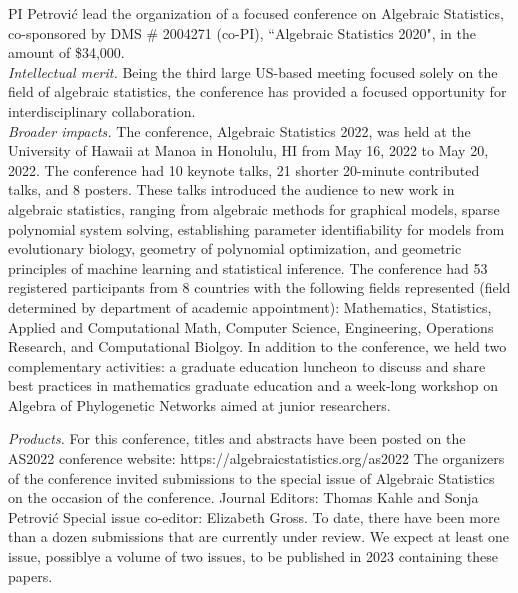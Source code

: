 \documentclass[11pt]{NSFamsart}
\begin{document}
PI Petrovi\'c  lead the organization of a focused 
 conference on Algebraic Statistics, co-sponsored by DMS \# 2004271 (co-PI), ``Algebraic Statistics 2020", in the amount of  \$34,000. 
\\
\emph{Intellectual merit.} Being the third large US-based meeting focused solely on the field of algebraic statistics,  the conference has provided a focused opportunity for interdisciplinary collaboration. 
\\
\emph{Broader impacts.} 
The conference, Algebraic Statistics 2022, was held at the University of Hawaii at Manoa in Honolulu, HI from May 16, 2022 to May 20, 2022. The conference had 10 keynote talks, 21 shorter 20-minute contributed talks, and 8 posters. These talks introduced the audience to new work in algebraic statistics, ranging from algebraic methods for graphical models, sparse polynomial system solving, establishing parameter identifiability for models from evolutionary biology, geometry of polynomial optimization, and geometric principles of machine learning and statistical inference.
The conference had 53 registered participants from 8 countries with the following fields represented (field determined by department of academic appointment): Mathematics, Statistics, Applied and Computational Math, Computer Science, Engineering, Operations Research, and Computational Biolgoy.  
In addition to the conference, we held two complementary activities: a graduate education luncheon to discuss and share best practices in mathematics graduate education and a week-long workshop on Algebra of Phylogenetic Networks aimed at junior researchers.

\emph{Products.} For this conference, titles and abstracts have been posted on the  AS2022 conference website: https://algebraicstatistics.org/as2022
The organizers of the conference invited submissions to the special issue of Algebraic Statistics on the occasion of the conference.
Journal Editors: Thomas Kahle and Sonja Petrović
Special issue co-editor: Elizabeth Gross. 
To date, there have been more than a dozen submissions that are currently under review. We expect at least one issue, possiblye a volume of two issues, to be published in 2023 containing these papers. 

\end{document}
